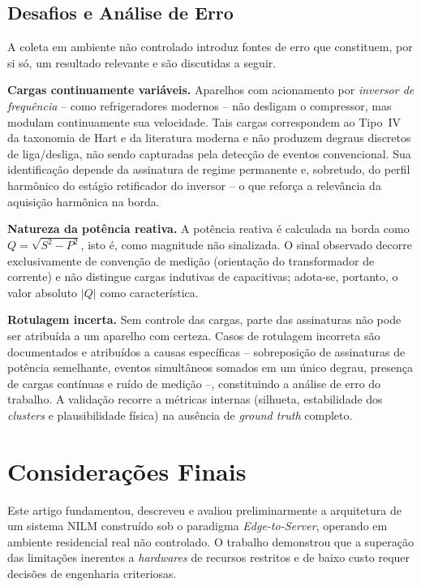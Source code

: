 \documentclass[12pt]{article}
\begin{document}
\subsection{Desafios e An\'alise de Erro}

A coleta em ambiente n\~ao controlado introduz fontes de erro que constituem, por
si s\'o, um resultado relevante e s\~ao discutidas a seguir.

\textbf{Cargas continuamente vari\'aveis.} Aparelhos com acionamento por
\textit{inversor de frequ\^encia} -- como refrigeradores modernos -- n\~ao
desligam o compressor, mas modulam continuamente sua velocidade. Tais cargas
correspondem ao Tipo~IV da taxonomia de Hart e da literatura moderna \citep{ref1,ref7} e n\~ao
produzem degraus discretos de liga/desliga, n\~ao sendo capturadas pela detec\c{c}\~ao
de eventos convencional. Sua identifica\c{c}\~ao depende da assinatura de regime
permanente e, sobretudo, do perfil harm\^onico do est\'agio retificador do
inversor -- o que refor\c{c}a a relev\^ancia da aquisi\c{c}\~ao harm\^onica na
borda.

\textbf{Natureza da pot\^encia reativa.} A pot\^encia reativa \'e calculada na
borda como $Q = \sqrt{S^2 - P^2}$, isto \'e, como magnitude n\~ao sinalizada. O
sinal observado decorre exclusivamente de conven\c{c}\~ao de medi\c{c}\~ao
(orienta\c{c}\~ao do transformador de corrente) e n\~ao distingue cargas
indutivas de capacitivas; adota-se, portanto, o valor absoluto $|Q|$ como
caracter\'istica.

\textbf{Rotulagem incerta.} Sem controle das cargas, parte das assinaturas n\~ao
pode ser atribu\'ida a um aparelho com certeza. Casos de rotulagem incorreta s\~ao
documentados e atribu\'idos a causas espec\'ificas -- sobreposi\c{c}\~ao de
assinaturas de pot\^encia semelhante, eventos simult\^aneos somados em um \'unico
degrau, presen\c{c}a de cargas cont\'inuas e ru\'ido de medi\c{c}\~ao --,
constituindo a an\'alise de erro do trabalho. A valida\c{c}\~ao recorre a
m\'etricas internas (silhueta, estabilidade dos \textit{clusters} e
plausibilidade f\'isica) na aus\^encia de \textit{ground truth} completo.


\section{Considera\c{c}\~oes Finais}

Este artigo fundamentou, descreveu e avaliou preliminarmente a arquitetura de
um sistema NILM constru\'ido sob o paradigma \textit{Edge-to-Server}, operando
em ambiente residencial real n\~ao controlado. O trabalho demonstrou que a
supera\c{c}\~ao das limita\c{c}\~oes inerentes a \textit{hardwares} de recursos
restritos e de baixo custo requer decis\~oes de engenharia criteriosas.
\end{document}
